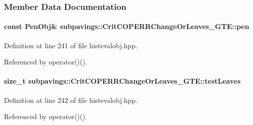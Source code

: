 \subsubsection{\-Member \-Data \-Documentation}
\hypertarget{classsubpavings_1_1CritCOPERRChangeOrLeaves__GTE_aace4dfbb6cd41e2d27ded2e340f445bd}{
\paragraph[{pen}]{\setlength{\rightskip}{0pt plus 5cm}const {\bf \-Pen\-Obj}\& {\bf subpavings\-::\-Crit\-C\-O\-P\-E\-R\-R\-Change\-Or\-Leaves\-\_\-\-G\-T\-E\-::pen}}}\label{classsubpavings_1_1CritCOPERRChangeOrLeaves__GTE_aace4dfbb6cd41e2d27ded2e340f445bd}


\-Definition at line 241 of file histevalobj.\-hpp.



\-Referenced by operator()().

\hypertarget{classsubpavings_1_1CritCOPERRChangeOrLeaves__GTE_a11be9290c3893dab1f64af62b4482a18}{
\paragraph[{test\-Leaves}]{\setlength{\rightskip}{0pt plus 5cm}size\-\_\-t {\bf subpavings\-::\-Crit\-C\-O\-P\-E\-R\-R\-Change\-Or\-Leaves\-\_\-\-G\-T\-E\-::test\-Leaves}}}\label{classsubpavings_1_1CritCOPERRChangeOrLeaves__GTE_a11be9290c3893dab1f64af62b4482a18}


\-Definition at line 242 of file histevalobj.\-hpp.



\-Referenced by operator()().

